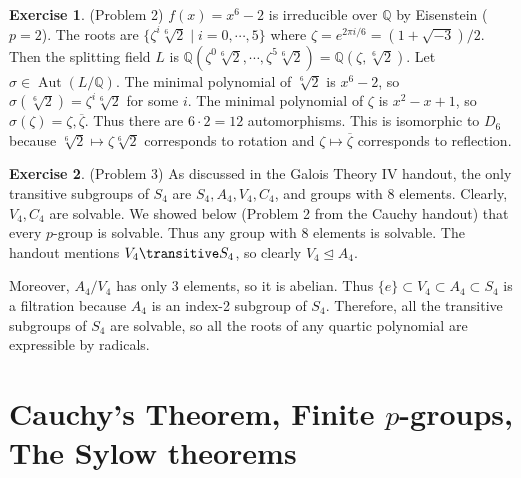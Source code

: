\documentclass[12pt, psamsfonts]{amsart}
\theoremstyle{definition}
\newtheorem*{exer}{Exercise}
\theoremstyle{remark}
\DeclareMathOperator{\Aut}{Aut}
\numberwithin{equation}{section}
\begin{document}
\begin{exer}{(Problem 2)}
  $f(x) = x^6 - 2$ is irreducible over $\mathbb{Q}$ by Eisenstein ($p = 2$).
  The roots are $\{ \zeta^{i} \sqrt[6]{2} \mid i = 0, \cdots, 5 \}$ where $\zeta = e^{2\pi i / 6} = (1 + \sqrt{-3}) / 2$.
  Then the splitting field $L$ is $\mathbb{Q}(\zeta^0\sqrt[6]{2}, \cdots, \zeta^5\sqrt[6]{2}) = \mathbb{Q}(\zeta, \sqrt[6]{2})$.
  Let $\sigma \in \Aut(L/\mathbb{Q})$.
  The minimal polynomial of $\sqrt[6]{2}$ is $x^6 - 2$, so $\sigma(\sqrt[6]{2}) = \zeta^i\sqrt[6]{2}$ for some $i$.
  The minimal polynomial of $\zeta$ is $x^2 - x + 1$, so $\sigma(\zeta) = \zeta, \overline{\zeta}$.
  Thus there are $6 \cdot 2 = 12$ automorphisms.
  This is isomorphic to $D_6$ because $\sqrt[6]{2} \mapsto \zeta\sqrt[6]{2}$ corresponds to rotation and $\zeta \mapsto \overline{\zeta}$ corresponds to reflection.
\end{exer}

\begin{exer}{(Problem 3)}
  As discussed in the Galois Theory IV handout, the only transitive subgroups of $S_4$ are $S_4, A_4, V_4, C_4$, and groups with 8 elements.
  Clearly, $V_4, C_4$ are solvable.
  We showed below (Problem 2 from the Cauchy handout) that every $p$-group is solvable.
  Thus any group with 8 elements is solvable.
  The handout mentions $V_4 \transitive S_4$, so clearly $V_4 \trianglelefteq A_4$.

  Moreover, $A_4 / V_4$ has only 3 elements, so it is abelian.
  Thus $\{ e \} \subset V_4 \subset A_4 \subset S_4$ is a filtration because $A_4$ is an index-2 subgroup of $S_4$.
  Therefore, all the transitive subgroups of $S_4$ are solvable, so all the roots of any quartic polynomial are expressible by radicals.
\end{exer}

\section{Cauchy's Theorem, Finite $p$-groups, The Sylow theorems}
\end{document}
